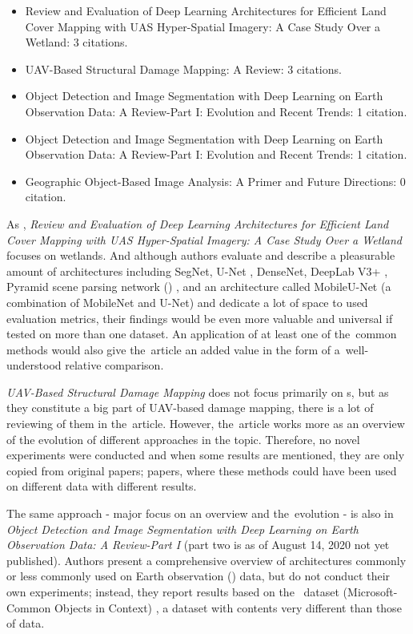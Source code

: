 \begin{itemize}
	\item Review and Evaluation of Deep Learning Architectures for Efficient Land Cover Mapping with UAS Hyper-Spatial Imagery: A Case Study Over a Wetland: 3 citations. \cite{review-dl-wetlands}
	\item UAV-Based Structural Damage Mapping: A Review: 3 citations. \cite{uav-building-damages}
	\item Object Detection and Image Segmentation with Deep Learning on Earth Observation Data: A Review-Part I: Evolution and Recent Trends: 1 citation. \cite{review-dl-eo}
	\item Object Detection and Image Segmentation with Deep Learning on Earth Observation Data: A Review-Part I: Evolution and Recent Trends: 1 citation. \cite{review-dl-eo}
	\item Geographic Object-Based Image Analysis: A Primer and Future Directions: 0 citation. \cite{geobia}
\end{itemize}

As \cite{very-deep-cnn-lc}, \textit{Review and Evaluation of Deep Learning Architectures for Efficient Land Cover Mapping with UAS Hyper-Spatial Imagery: A Case Study Over a Wetland} focuses on wetlands. And although authors evaluate and describe a pleasurable amount of architectures including SegNet, U-Net \cite{u-net}, DenseNet, DeepLab V3+ \cite{deeplab}, Pyramid scene parsing network () \cite{pspnet}, and an architecture called MobileU-Net (a combination of MobileNet \cite{mobilenet} and U-Net) and dedicate a lot of space to used evaluation metrics, their findings would be even more valuable and universal if tested on more than one dataset. An application of at least one of the~common  methods would also give the~article an added value in the form of a~well-understood relative comparison.

\textit{UAV-Based Structural Damage Mapping} does not focus primarily on s, but as they constitute a big part of UAV-based damage mapping, there is a lot of reviewing of them in the~article. However, the~article works more as an overview of the evolution of different approaches in the topic. Therefore, no novel experiments were conducted and when some results are mentioned, they are only copied from original papers; papers, where these methods could have been used on different data with different results.

The same approach - major focus on an overview and the~evolution - is also in \textit{Object Detection and Image Segmentation with Deep Learning on Earth Observation Data: A Review-Part I} (part two is as of August 14, 2020 not yet published). Authors present a comprehensive overview of  architectures commonly or less commonly used on Earth observation () data, but do not conduct their own experiments; instead, they report results based on the~ dataset (Microsoft-Common Objects in Context) \cite{coco}, a dataset with contents very different than those of  data.

